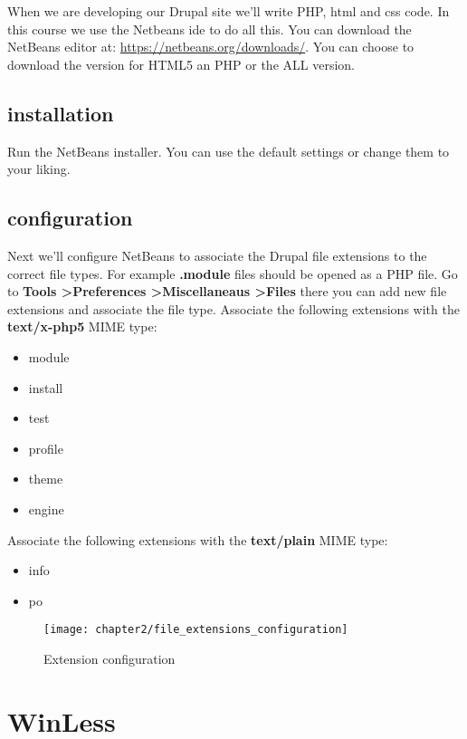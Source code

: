 When we are developing our Drupal site we'll write PHP, html and css code. In this course we use the Netbeans ide to do all this. You can download the NetBeans editor at: \url{https://netbeans.org/downloads/}. You can choose to download the version for HTML5 an PHP or the ALL version.

\subsection{installation}

Run the NetBeans installer. You can use the default settings or change them to your liking. 

\subsection{configuration}

Next we'll configure NetBeans to associate the Drupal file extensions to the correct file types. For example \textbf{.module} files should be opened as a PHP file.
Go to \textbf{Tools \textgreater Preferences \textgreater Miscellaneaus \textgreater Files} there you can add new file extensions and associate the file type. Associate the following extensions with the \textbf{text/x-php5} MIME type:

\begin{itemize}
	\item module
	\item install
	\item test
	\item profile
	\item theme
	\item engine
\end{itemize}

Associate the following extensions with the \textbf{text/plain} MIME type:
\begin{itemize}
	\item info
	\item po
\end{itemize}

\begin{figure}[H]
	\centering
	\texttt{[image: chapter2/file\_extensions\_configuration]}
	\caption{Extension configuration}
	\label{fig:file_extension_configuration}
\end{figure}

\section{WinLess}

